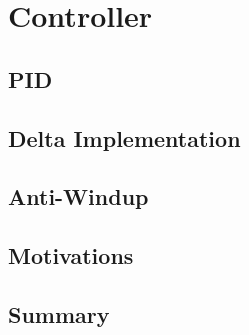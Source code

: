 \chapter{Controller}
\label{chap:sixth}
\ifpdf
    \graphicspath{{Chapter6/Figures/PNG/}{Chapter6/Figures/PDF/}{Chapter6/Figures/}{Chapter6/Figures/EPS/}}
\else
    \graphicspath{{Chapter6/Figures/EPS/}{Chapter6/Figures/}}
\fi


\section{PID}
\section{Delta Implementation}
\section{Anti-Windup}
\section{Motivations}
\section{Summary}